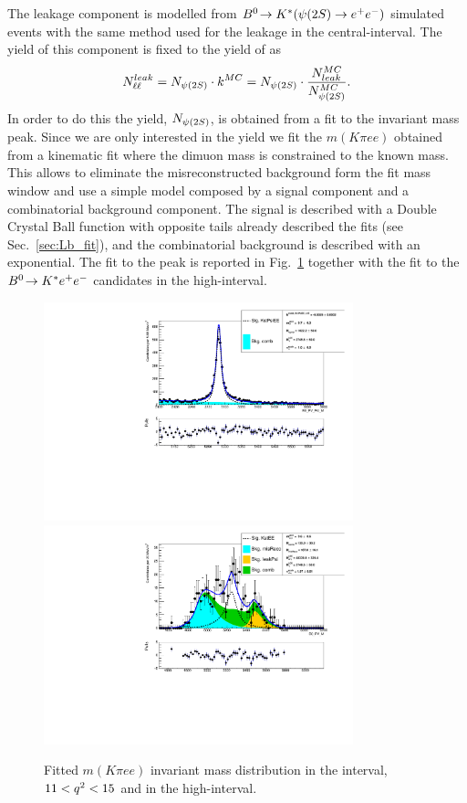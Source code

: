 The \psitwos leakage component is modelled from $\decay{\Bz}{\Kstar(\psitwos\to\ee)}$
simulated events with the same method used for the \jpsi leakage in the central-\qsq interval.
The yield of this component is fixed to the yield of \psitwos as
\begin{equation}
N_{\ell\ell}^{leak} = N_{\psitwos} \cdot k^{MC} = N_{\psitwos} \cdot \frac{N_{leak}^{MC}}{N_{\psitwos}^{MC}}.
\end{equation}
 In order to do this the \psitwos yield, $N_{\psitwos}$, is obtained from a fit to the \psitwos invariant
 mass peak. Since we are only interested in the \psitwos yield we fit the $m(K\pi ee)$ obtained from
 a kinematic fit where the dimuon mass is constrained to the known \psitwos mass.
 This allows to eliminate the misreconstructed background form the fit mass window and
 use a simple model composed by a signal component and a combinatorial background component.
 The signal is described with a Double Crystal Ball function with opposite tails
 already described the \Lb fits (see Sec.~\ref{sec:Lb_fit}), and the combinatorial
 background is described with an exponential.
 The fit to the \psitwos peak is reported in Fig.~\ref{fig:fit_ee_highq2}
 together with the fit to the ${{B}^0}\!\rightarrow {\ensuremath{{K}^*}} e^+ e^-$ candidates in the high-\qsq interval.
 
\begin{figure}[h!]
\centering
\includegraphics[width=0.8\textwidth]{RKst/figs/fit_EEs_0_EE-q2high-gmc/KstPsiEE_L0E_fitAndRes.pdf}
\includegraphics[width=0.8\textwidth]{RKst/figs/fit_EEs_0_EE-q2high-gmc/KstEE_L0E_fitAndRes.pdf}
\caption{Fitted $m(K\pi ee)$ invariant mass distribution in the \psitwos interval, $11 < {q^2} < 15$ \gevgevcccc
and in the high-\qsq interval. }
\label{fig:fit_ee_highq2}
\end{figure}

